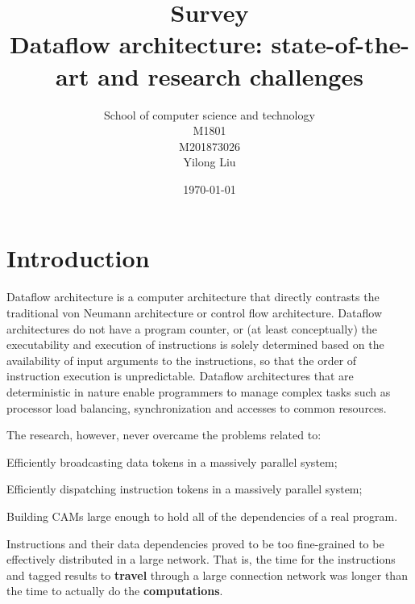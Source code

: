 \documentclass[UTF8]{article}
\title{Survey \\ \bigskip \textbf{Dataflow architecture: state-of-the-art and research challenges}}
\author{School of computer science and technology\\ M1801\\ M201873026\\ Yilong Liu}
\date{\today}
\begin{document}
\maketitle
\newpage


\tableofcontents
\newpage


\section{Introduction}
Dataflow architecture is a computer architecture that
directly contrasts the traditional von Neumann architecture
or control flow architecture.
Dataflow architectures do not have a program counter,
or (at least conceptually) the executability
and execution of instructions is solely determined
based on the availability of input arguments to the instructions,
so that the order of instruction execution is unpredictable.
Dataflow architectures that are deterministic in nature
enable programmers to manage complex tasks
such as processor load balancing, synchronization and accesses to common resources.

The research, however, never overcame the problems related to:
\begin{compactitem}
  \item Efficiently broadcasting data tokens in a massively parallel system;
  \item Efficiently dispatching instruction tokens in a massively parallel system;
  \item Building CAMs large enough to hold all of the dependencies of a real program.
\end{compactitem}
Instructions and their data dependencies proved to be too fine-grained to be effectively distributed in a large network.
That is, the time for the instructions and tagged results to \textbf{travel} through a large connection network
was longer than the time to actually do the \textbf{computations}.
\end{document}
